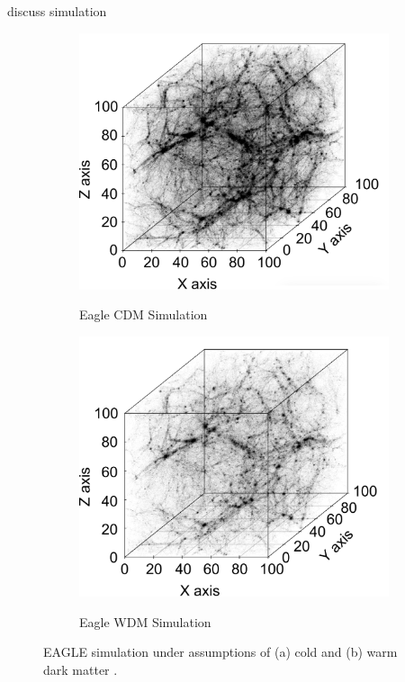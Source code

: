 \documentclass[12pt]{article}
\begin{document}
{\color{red} discuss simulation}
\begin{figure}[htp!]
  \centering
  \begin{subfigure}{.49\textwidth}
    \centering
    \caption{Eagle CDM Simulation}  \includegraphics[width=\linewidth]{wdmfig.pdf}
    \label{fig:introDataCDM}
  \end{subfigure}
    \begin{subfigure}{.49\textwidth}
    \centering
    \caption{Eagle WDM Simulation}  \includegraphics[width=\linewidth]{cdmfig.pdf}
    \label{fig:introDataWDM}
  \end{subfigure}
    \caption{EAGLE simulation under assumptions of (a) cold and (b) warm dark matter \cite{schaye2015eagle}.} 
    \label{fig:introData}
\end{figure}
\end{document}
